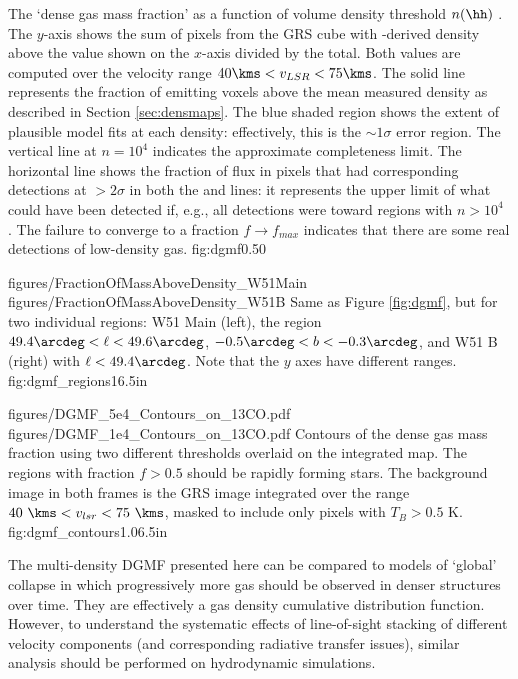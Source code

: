 {The `dense gas mass fraction' as a function of volume density threshold
$n(\hh)$ \percc.  The $y$-axis shows the sum of \thirteenco pixels from the GRS
cube with
\formaldehyde-derived density above the value shown on the $x$-axis divided by
the total.  Both values are computed over the velocity range $40 \kms < v_{LSR}
< 75 \kms$.  The solid line represents the fraction of \thirteenco emitting
voxels above the mean measured \formaldehyde density as described in Section
\ref{sec:densmaps}.
The blue shaded region shows the extent of plausible model fits at
each density: effectively, this is the $\sim1\sigma$ error region.  The
vertical line at $n=10^4$ \percc indicates the approximate completeness limit.
The horizontal line shows the fraction of \thirteenco flux in pixels that had
corresponding detections at
$>2\sigma$ in both the \formaldehyde \oneone and \twotwo lines: it represents
the upper limit of what could have been detected if, e.g., all \formaldehyde
detections were
toward regions with $n>10^4$ \percc.  The failure to converge to a fraction
$f\rightarrow f_{max}$ indicates that there are some real detections of
low-density gas.}
{fig:dgmf}{0.5}{0}

\FigureTwoAA
{figures/FractionOfMassAboveDensity_W51Main}
{figures/FractionOfMassAboveDensity_W51B}
{Same as Figure \ref{fig:dgmf}, but for two individual regions: W51 Main
(left), the region $49.4\arcdeg < \ell < 49.6\arcdeg$, $-0.5\arcdeg < b <
-0.3\arcdeg$, and W51 B (right) with $\ell < 49.4\arcdeg$.  Note
that the $y$ axes have different ranges.}
{fig:dgmf_regions}{1}{6.5in}

\FigureTwoAA
{figures/DGMF_5e4_Contours_on_13CO.pdf}
{figures/DGMF_1e4_Contours_on_13CO.pdf}
{Contours of the dense gas mass fraction using two different thresholds
overlaid on the integrated \thirteenco map.  The regions with fraction $f>0.5$
should be rapidly forming stars.  The background image in both frames is the
GRS \thirteenco image integrated over the range $40~\kms < v_{lsr} < 75~\kms$,
masked to include only pixels with $T_B>0.5$ K.}
{fig:dgmf_contours}{1.0}{6.5in}

The multi-density DGMF presented here can be compared to models of `global'
collapse in which progressively more gas should be observed in denser structures
over time.  They are effectively a gas density cumulative distribution function.
However, to understand the systematic effects of line-of-sight stacking of
different velocity components (and corresponding radiative transfer issues),
similar analysis should be performed on hydrodynamic simulations.

